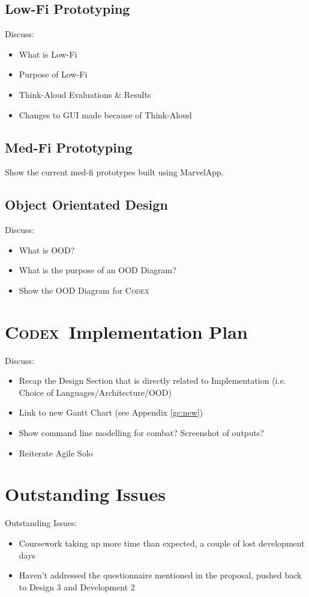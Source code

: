 \documentclass[progress]{cmpreport}
\newcommand{\Codex}{\textsc{Codex}}
\begin{document}
		\subsection{Low-Fi Prototyping}
		Discuss:
		\begin{itemize}
			\item What is Low-Fi
			\item Purpose of Low-Fi
			\item Think-Aloud Evaluations \& Results
			\item Changes to GUI made because of Think-Aloud
		\end{itemize}
	
		\subsection{Med-Fi Prototyping}
		Show the current med-fi prototypes built using MarvelApp.
		
		\subsection{Object Orientated Design}
		Discuss:
		\begin{itemize}
			\item What is OOD?
			\item What is the purpose of an OOD Diagram?
			\item Show the OOD Diagram for \Codex
		\end{itemize}
	
	\section{\Codex \ Implementation Plan}
	Discuss:
	\begin{itemize}
		\item Recap the Design Section that is directly related to Implementation (i.e. Choice of Languages/Architecture/OOD)
		\item Link to new Gantt Chart (see Appendix \ref{gc:new})
		\item Show command line modelling for combat? Screenshot of outputs?
		\item Reiterate Agile Solo
	\end{itemize}
	
	\section{Outstanding Issues} \label{sec:Issues}
	Outstanding Issues:
	\begin{itemize}
		\item Coursework taking up more time than expected, a couple of lost development days
		\item Haven't addressed the questionnaire mentioned in the proposal, pushed back to Design 3 and Development 2
	\end{itemize}
\end{document}
